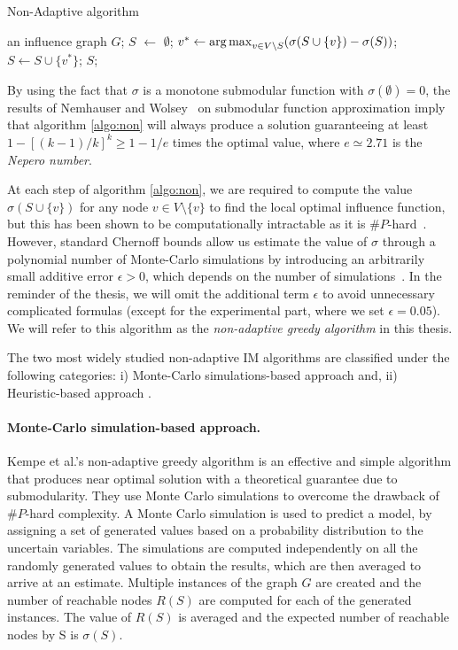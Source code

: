\begin{algorithm}[ht]
	\caption{Non-Adaptive algorithm}
	\label{algo:non}
	\begin{algorithmic}[1]
		\REQUIRE an influence graph $G$;
		\STATE $S$ $\leftarrow$ $\emptyset$;
		\STATE $v^* \leftarrow \operatorname*{arg\,max}_{v \in V \setminus S} (\sigma(S \cup \{v\})-\sigma(S))$;
		\STATE $S \leftarrow S \cup \{v^*\} $;
		\ENDWHILE
		\RETURN $S$;
	\end{algorithmic}
\end{algorithm}





\medskip

By using the fact that $\sigma$ is a monotone submodular function with $\sigma(\emptyset)=0$, the results of Nemhauser and Wolsey~\cite{Company1978} on submodular function approximation imply that algorithm \ref{algo:non} will always produce a solution guaranteeing at least $1-[(k-1)/k]^k\geq 1-1/e$ times the optimal value, where $e\simeq 2.71$ is the {\em Nepero number}.

At each step of algorithm \ref{algo:non}, we are required to compute the value $\sigma(S\cup\{v\})$ for any node $v\in V\setminus \{v\}$ to find the local optimal influence function, but this has been shown to be computationally intractable as it is $\#P$-hard~\cite{Chen10}. However, standard Chernoff bounds allow us estimate the value of $\sigma$ through a polynomial number of Monte-Carlo simulations by introducing an arbitrarily small additive error $\epsilon>0$, which depends on the number of simulations~\cite{Kempe2015}. In the reminder of the thesis, we will omit the additional term $\epsilon$ to avoid unnecessary complicated formulas (except for the experimental part, where we set $\epsilon=0.05$). We will refer to this algorithm as the \emph{non-adaptive greedy algorithm} in this thesis.

The two most widely studied non-adaptive IM algorithms are classified under the following categories: i) Monte-Carlo simulations-based approach \cite{Kempe2003} and, ii) Heuristic-based approach \cite{Borgs2014}.


\paragraph{Monte-Carlo simulation-based approach.} Kempe et al.'s non-adaptive greedy algorithm is an effective and simple algorithm that produces near optimal solution with a theoretical guarantee due to submodularity. They use Monte Carlo simulations to overcome the drawback of $\#P$-hard complexity. A Monte Carlo simulation is used to predict a model, by assigning a set of generated values based on a probability distribution to the uncertain variables. The simulations are computed independently on all the randomly generated values to obtain the results, which are then averaged to arrive at an estimate. Multiple instances of the graph $G$ are created and the number of reachable nodes $R(S)$ are computed for each of the generated instances. The value of $R(S)$ is averaged and the expected number of reachable nodes by S is $\sigma(S)$.


